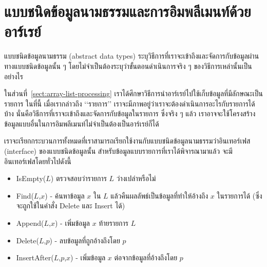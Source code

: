 \section{แบบ{\wbr}ชนิด{\wbr}ข้อมูล{\wbr}นามธรรม{\wbr}และ{\wbr}การ{\wbr}อิม{\wbr}พลี{\wbr}เมนท์{\wbr}ด้วย{\wbr}อาร์เรย์}

แบบ{\wbr}ชนิด{\wbr}ข้อมูล{\wbr}นามธรรม (abstract data types)
ระบุ{\wbr}วิธีการ{\wbr}ที่{\wbr}เรา{\wbr}จะ{\wbr}เข้าถึง{\wbr}และ{\wbr}จัดการ{\wbr}กับ{\wbr}ข้อมูล{\wbr}ผ่าน{\wbr}ทาง{\wbr}แบบ{\wbr}ชนิด{\wbr}ข้อมูล{\wbr}นั้น ๆ
โดย{\wbr}ไม่{\wbr}จำเป็น{\wbr}ต้อง{\wbr}ระบุ{\wbr}ว่า{\wbr}ขั้นตอน{\wbr}ดำเนินการ{\wbr}จริง ๆ ของ{\wbr}วิธีการ{\wbr}เหล่านั้น{\wbr}เป็น{\wbr}อย่างไร{\wbr}

ใน{\wbr}ส่วน{\wbr}ที่~\ref{sect:array-list-processing}
เรา{\wbr}ได้{\wbr}ศึกษา{\wbr}วิธีการ{\wbr}นำ{\wbr}อาร์เรย์{\wbr}ไป{\wbr}ใช้{\wbr}เก็บ{\wbr}ข้อมูล{\wbr}ที่{\wbr}มี{\wbr}ลักษณะ{\wbr}เป็น{\wbr}รายการ ใน{\wbr}ที่นี้ เมื่อ{\wbr}เรา{\wbr}กล่าว{\wbr}ถึง{\wbr}
`{\wbr}`{\wbr}รายการ'' เรา{\wbr}จะ{\wbr}มี{\wbr}ภาพ{\wbr}อยู่{\wbr}ว่า{\wbr}เรา{\wbr}จะ{\wbr}ต้อง{\wbr}ดำเนินการ{\wbr}อะไร{\wbr}กับ{\wbr}รายการ{\wbr}ได้{\wbr}บ้าง{\wbr}
นั่น{\wbr}คือ{\wbr}วิธีการ{\wbr}ที่{\wbr}เรา{\wbr}จะ{\wbr}เข้าถึง{\wbr}และ{\wbr}จัดการ{\wbr}กับ{\wbr}ข้อมูล{\wbr}ใน{\wbr}รายการ ซึ่ง{\wbr}จริง ๆ แล้ว{\wbr}
เรา{\wbr}อาจ{\wbr}จะ{\wbr}ใช้{\wbr}โครงสร้าง{\wbr}ข้อมูล{\wbr}แบบ{\wbr}อื่น{\wbr}ใน{\wbr}การ{\wbr}อิม{\wbr}พลี{\wbr}เมนท์{\wbr}ไม่{\wbr}จำเป็น{\wbr}ต้อง{\wbr}เป็น{\wbr}อาร์เรย์{\wbr}ก็ได้{\wbr}

เรา{\wbr}จะ{\wbr}เรียก{\wbr}กระบวนการ{\wbr}ทั้งหมด{\wbr}ที่{\wbr}เรา{\wbr}สามารถ{\wbr}เรียก{\wbr}ใช้{\wbr}งาน{\wbr}กับ{\wbr}แบบ{\wbr}ชนิด{\wbr}ข้อมูล{\wbr}นามธรรม{\wbr}ว่า{\wbr}อิน{\wbr}เทอร์เฟส
(interface) ของ{\wbr}แบบ{\wbr}ชนิด{\wbr}ข้อมูล{\wbr}นั้น สำหรับ{\wbr}ข้อมูล{\wbr}แบบ{\wbr}รายการ{\wbr}ที่{\wbr}เรา{\wbr}ได้{\wbr}พิจารณา{\wbr}มา{\wbr}แล้ว{\wbr}
จะ{\wbr}มี{\wbr}อิน{\wbr}เทอร์เฟส{\wbr}โดย{\wbr}ทั่วไป{\wbr}ดังนี้{\wbr}

\begin{itemize}
\item IsEmpty($L$) ตรวจสอบ{\wbr}ว่า{\wbr}รายการ $L$ ว่างเปล่า{\wbr}หรือ{\wbr}ไม่{\wbr}
\item Find($L$,$x$) - ค้นหา{\wbr}ข้อมูล $x$ ใน $L$ แล้ว{\wbr}คืน{\wbr}ผลลัพธ์{\wbr}เป็น{\wbr}ข้อมูล{\wbr}ที่{\wbr}ทำ{\wbr}ให้{\wbr}อ้าง{\wbr}ถึง{\wbr}
  $x$ ใน{\wbr}รายการ{\wbr}ได้ (ซึ่ง{\wbr}จะ{\wbr}ถูก{\wbr}ใช้{\wbr}ใน{\wbr}คำสั่ง Delete และ Insert ได้)
\item Append($L$,$x$) - เพิ่ม{\wbr}ข้อมูล $x$ ท้าย{\wbr}รายการ $L$
\item Delete($L$,$p$) - ลบ{\wbr}ข้อมูล{\wbr}ที่{\wbr}ถูก{\wbr}อ้าง{\wbr}ถึง{\wbr}โดย $p$
\item InsertAfter($L$,$p$,$x$) - เพิ่ม{\wbr}ข้อมูล $x$ ต่อ{\wbr}จาก{\wbr}ข้อมูล{\wbr}ที่{\wbr}อ้าง{\wbr}ถึง{\wbr}โดย $p$
\end{itemize}

